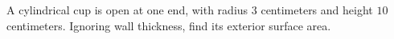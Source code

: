 A cylindrical cup is open at one end, with radius $3$ centimeters and height $10$ centimeters. Ignoring wall thickness, find its exterior surface area.

